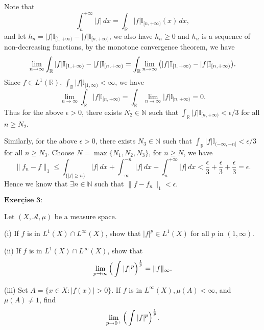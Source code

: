 \documentclass[12pt,a4paper]{ctexart}
\begin{document}
Note that
\begin{equation*}
    \int_{n}^{+ \infty} |f| \, d x = \int_{\mathbb{R}}^{} |f| \mathbb{I}_{[n, +\infty)} (x) \, d x,
\end{equation*}
and let $h_n = |f| \mathbb{I}_{[1, +\infty)} - |f| \mathbb{I}_{[n, +\infty)}$, we also have $h_n \geq 0$ and $h_n$ is a sequence of non-decreasing functions, by the monotone convergence theorem, we have
$$\lim_{n \to \infty} \int_{\mathbb R} |f| \mathbb{I}_{[1, +\infty)} - |f| \mathbb{I}_{[n, +\infty)} = \int_{\mathbb R} \lim_{n \to \infty}  \big{(} |f| \mathbb{I}_{[1, +\infty)} - |f| \mathbb{I}_{[n, +\infty)} \big{)}.$$
Since $f \in L^1(\mathbb R)$, $\int_{\mathbb R} |f| \mathbb I_{[1, \infty)} < \infty$,  we have
$$\lim_{n \to \infty} \int_{\mathbb R} |f| \mathbb{I}_{[n, +\infty)} = \int_{\mathbb R} \lim_{n \to \infty}   |f| \mathbb{I}_{[n, +\infty)} = 0.$$
Thus for the above $\epsilon > 0$, there exists $N_2 \in \mathbb N$ such that $\int_{\mathbb R} |f| \mathbb{I}_{[n, +\infty)} < \epsilon/3$ for all $n \geq N_2$.

Similarly, for the above $\epsilon > 0$, there exists $N_3 \in \mathbb N$ such that $\int_{\mathbb R} |f| \mathbb{I}_{(-\infty, -n]} < \epsilon/3$ for all $n \geq N_3$.
Choose $N = \max \{N_1, N_2, N_3\}$, for $n \geq N$, we have
\begin{equation*}
    \|f_{n} - f\|_{1} \leq  \int_{\{|f| \geq n\}}^{} |f| \, d x + \int_{-\infty}^{-n} |f| \, d x + \int_{n}^{+\infty} |f| \, d x < \frac{\epsilon}{3} + \frac{\epsilon}{3} + \frac{\epsilon}{3} = \epsilon.
\end{equation*}
Hence we know that $\exists n \in \mathbb{N}$ such that $\|f - f_{n}\|_{1} < \epsilon$.

\newpage

$\underline{\textbf{Exercise 3:}}$

Let $(X, \mathcal{A}, \mu)$ be a measure space.

(i) If $f$ is in $L^{1}(X) \cap L^{\infty}(X)$, show that $|f|^{p} \in L^{1}(X)$ for all $p$ in $(1, \infty)$.

(ii) If $f$ is in $L^{1}(X) \cap L^{\infty}(X)$, show that
\begin{equation*}
    \lim_{p \to \infty} \Big{(} \int_{}^{} |f|^{p} \Big{)}^{\frac{1}{p}} = \|f\|_{\infty}.
\end{equation*}

(iii) Set $A = \{x \in X: |f(x)| > 0\}$. If $f$ is in $L^{\infty} (X), \mu(A) < \infty$, and $\mu(A) \neq 1$, find
\begin{equation*}
    \lim_{p \to 0^{+}} \Big{(} \int_{}^{} |f|^{p} \Big{)}^{\frac{1}{p}}.
\end{equation*}
\end{document}
